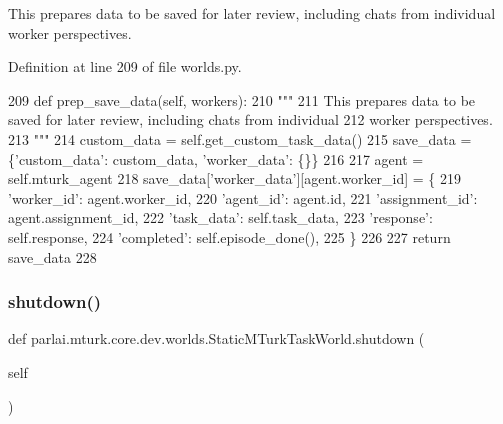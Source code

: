 \begin{DoxyVerb}This prepares data to be saved for later review, including chats from individual
worker perspectives.
\end{DoxyVerb}
 

Definition at line 209 of file worlds.\+py.


\begin{DoxyCode}
209     \textcolor{keyword}{def }prep\_save\_data(self, workers):
210         \textcolor{stringliteral}{"""}
211 \textcolor{stringliteral}{        This prepares data to be saved for later review, including chats from individual}
212 \textcolor{stringliteral}{        worker perspectives.}
213 \textcolor{stringliteral}{        """}
214         custom\_data = self.get\_custom\_task\_data()
215         save\_data = \{\textcolor{stringliteral}{'custom\_data'}: custom\_data, \textcolor{stringliteral}{'worker\_data'}: \{\}\}
216 
217         agent = self.mturk\_agent
218         save\_data[\textcolor{stringliteral}{'worker\_data'}][agent.worker\_id] = \{
219             \textcolor{stringliteral}{'worker\_id'}: agent.worker\_id,
220             \textcolor{stringliteral}{'agent\_id'}: agent.id,
221             \textcolor{stringliteral}{'assignment\_id'}: agent.assignment\_id,
222             \textcolor{stringliteral}{'task\_data'}: self.task\_data,
223             \textcolor{stringliteral}{'response'}: self.response,
224             \textcolor{stringliteral}{'completed'}: self.episode\_done(),
225         \}
226 
227         \textcolor{keywordflow}{return} save\_data
228 
\end{DoxyCode}
\mbox{\label{classparlai_1_1mturk_1_1core_1_1dev_1_1worlds_1_1StaticMTurkTaskWorld_a75fabb1fa04ac186143e76abd756f372}} 
\subsubsection{\texorpdfstring{shutdown()}{shutdown()}}
{\footnotesize\ttfamily def parlai.\+mturk.\+core.\+dev.\+worlds.\+Static\+M\+Turk\+Task\+World.\+shutdown (\begin{DoxyParamCaption}\item[{}]{self }\end{DoxyParamCaption})}

